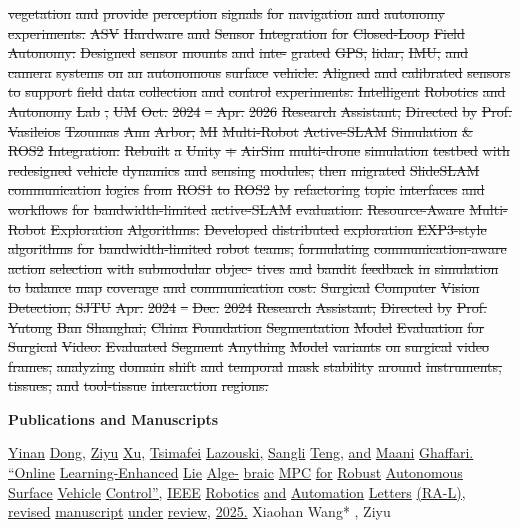 \documentclass[10pt,letterpaper]{article}
\newcommand{\del}[1]{{\color{red}\sout{#1}}}
\newcommand{\add}[1]{{\color{blue}\uline{#1}}}
\begin{document}
\del{vegetation} \del{and} \del{provide} \del{perception} \del{signals} \del{for} \del{navigation} \del{and} \del{autonomy} \del{experiments.} \del{} \del{ASV} \del{Hardware} \del{and} \del{Sensor} \del{Integration} \del{for} \del{Closed-Loop} \del{Field} \del{Autonomy:} \del{Designed} \del{sensor} \del{mounts} \del{and} \del{inte-} \del{grated} \del{GPS,} \del{lidar,} \del{IMU,} \del{and} \del{camera} \del{systems} \del{on} \del{an} \del{autonomous} \del{surface} \del{vehicle.} \del{Aligned} \del{and} \del{calibrated} \del{sensors} \del{to} \del{support} \del{field} \del{data} \del{collection} \del{and} \del{control} \del{experiments.} \del{Intelligent} \del{Robotics} \del{and} \del{Autonomy} \del{Lab} \del{,} \del{UM} \del{Oct.} \del{2024} \del{--} \del{Apr.} \del{2026} \del{Research} \del{Assistant,} \del{Directed} \del{by} \del{Prof.} \del{Vasileios} \del{Tzoumas} \del{Ann} \del{Arbor,} \del{MI} \del{} \del{Multi-Robot} \del{Active-SLAM} \del{Simulation} \del{\&} \del{ROS2} \del{Integration:} \del{Rebuilt} \del{a} \del{Unity} \del{+} \del{AirSim} \del{multi-drone} \del{simulation} \del{testbed} \del{with} \del{redesigned} \del{vehicle} \del{dynamics} \del{and} \del{sensing} \del{modules,} \del{then} \del{migrated} \del{SlideSLAM} \del{communication} \del{logics} \del{from} \del{ROS1} \del{to} \del{ROS2} \del{by} \del{refactoring} \del{topic} \del{interfaces} \del{and} \del{workflows} \del{for} \del{bandwidth-limited} \del{active-SLAM} \del{evaluation.} \del{} \del{Resource-Aware} \del{Multi-Robot} \del{Exploration} \del{Algorithms:} \del{Developed} \del{distributed} \del{exploration} \del{EXP3-style} \del{algorithms} \del{for} \del{bandwidth-limited} \del{robot} \del{teams,} \del{formulating} \del{communication-aware} \del{action} \del{selection} \del{with} \del{submodular} \del{objec-} \del{tives} \del{and} \del{bandit} \del{feedback} \del{in} \del{simulation} \del{to} \del{balance} \del{map} \del{coverage} \del{and} \del{communication} \del{cost.} \del{Surgical} \del{Computer} \del{Vision} \del{Detection,} \del{SJTU} \del{Apr.} \del{2024} \del{--} \del{Dec.} \del{2024} \del{Research} \del{Assistant,} \del{Directed} \del{by} \del{Prof.} \del{Yutong} \del{Ban} \del{Shanghai,} \del{China} \del{} \del{Foundation} \del{Segmentation} \del{Model} \del{Evaluation} \del{for} \del{Surgical} \del{Video:} \del{Evaluated} \del{Segment} \del{Anything} \del{Model} \del{variants} \del{on} \del{surgical} \del{video} \del{frames,} \del{analyzing} \del{domain} \del{shift} \del{and} \del{temporal} \del{mask} \del{stability} \del{around} \del{instruments,} \del{tissues,} \del{and} \del{tool-tissue} \del{interaction} \del{regions.} \par\medskip\textbf{Publications and Manuscripts}\par  \add{} \add{Yinan} \add{Dong,} \add{Ziyu} \add{Xu,} \add{Tsimafei} \add{Lazouski,} \add{Sangli} \add{Teng,} \add{and} \add{Maani} \add{Ghaffari.} \add{``Online} \add{Learning-Enhanced} \add{Lie} \add{Alge-} \add{braic} \add{MPC} \add{for} \add{Robust} \add{Autonomous} \add{Surface} \add{Vehicle} \add{Control'',} \add{IEEE} \add{Robotics} \add{and} \add{Automation} \add{Letters} \add{(RA-L),} \add{revised} \add{manuscript} \add{under} \add{review,} \add{2025.}  Xiaohan Wang* , Ziyu 
\end{document}
